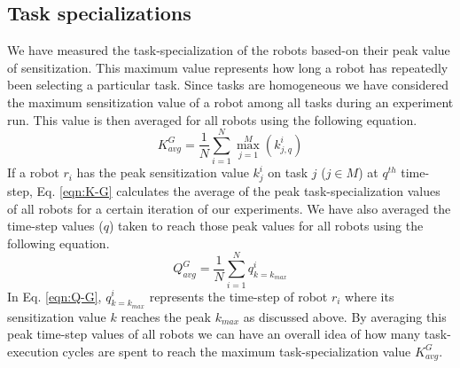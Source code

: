 \documentclass[journal]{IEEEtran}
\begin{document}
\subsection{Task specializations}
We have measured the task-specialization of the robots based-on their peak value of sensitization. This maximum value represents how long a robot has repeatedly been selecting a particular task. Since tasks are homogeneous we have considered the maximum sensitization value of a robot among all tasks during an experiment run. This value is then averaged for all robots using the following  equation. 
\begin{equation}
K^G_{avg} = \frac{1}{N}\sum_{i=1}^{N} \max_{j=1}^M\left ( k^i_{j, q} \right ) 
\label{eqn:K-G}
\end{equation}
If a robot $r_i$ has the peak sensitization value $k^i_j$ on task $j$ ($j \in M$)  at $q^{th}$ time-step, Eq. \ref{eqn:K-G} calculates the average of the peak task-specialization values of all robots for a certain iteration of our experiments. We have also averaged the time-step values ($q$) taken to reach those peak values for all robots using the following equation.
\begin{equation}
Q^G_{avg}= \frac{1}{N}\sum_{i=1}^{N} q^i_{k=k_{max}}
\label{eqn:Q-G}
\end{equation}
In Eq. \ref{eqn:Q-G}, $q^i_{k=k_{max}}$ represents the time-step of robot $r_i$  where its sensitization value $k$ reaches the peak $k_{max}$ as discussed above. By averaging this peak time-step values of all robots we can have an overall idea of how many task-execution cycles are spent to reach the maximum task-specialization value $K^G_{avg}$.
\end{document}
